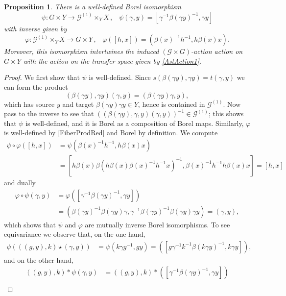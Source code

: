 \documentclass[11pt, oneside]{amsart}
\newtheorem{prop}[lemma]{Proposition}
\theoremstyle{definition}
\theoremstyle{remark}
\theoremstyle{TheoremNum}
\newcommand{\cG}{\mathcal{G}}
\renewcommand{\phi}{\varphi}
\begin{document}
\begin{prop}\label{psiIso} There is a well-defined Borel isomorphism
\begin{equation}\label{psi}
  \psi: G\times Y\to \mathcal{G}^{(1)} \times_Y X\,,\;\;\; \psi(\gamma,y)=[\gamma^{-1}\beta(\gamma y)^{-1}, \gamma y]\end{equation}
 with inverse given by
  $$\phi: \mathcal{G}^{(1)} \times_Y X \to G\times Y\,,\;\;\; \phi([h,x])=(\beta(x)^{-1} h^{-1} , h \beta(x) x).$$
 Moreover, this isomorphism intertwines the induced $(\cG \times G)$-action action on $G\times Y$ with the action on the transfer space given by \eqref{AstAction1}.
\end{prop}
\begin{proof} We first show that $\psi$ is well-defined. Since $s(\beta(\gamma y), \gamma y) = t(\gamma, y)$ we can form the product
\[
(\beta(\gamma y), \gamma y)(\gamma, y) = (\beta(\gamma y)\gamma, y),
\]
which has source $y$ and target $\beta(\gamma y)\gamma y \in Y$, hence is contained in $\cG^{(1)}$. Now pass to the inverse to see that $((\beta(\gamma y), \gamma, y)(\gamma, y))^{-1} \in \cG^{(1)}$; this shows that $\psi$ is well-defined, and it is Borel as a composition of Borel maps. Similarly, $\phi$ is well-defined by \eqref{FiberProdRed} and Borel by definition. We compute 
  \begin{align*}
    \psi \circ \phi([h,x]) &= \psi(\beta(x)^{-1} h^{-1},h \beta(x) x)\\
     & = [h \beta(x) \beta(h \beta(x)\beta(x)^{-1} h^{-1}x)^{-1} , \beta(x)^{-1} h^{-1}h\beta(x) x ] = [h,x]
  \end{align*}
  and dually
  \begin{align*}
  \phi\circ \psi(\gamma,y)&= \phi ([\gamma^{-1}\beta( \gamma y)^{-1},\gamma y])\\
 &= (\beta(\gamma y)^{-1}\beta( \gamma y) \gamma , \gamma^{-1}\beta(\gamma y)^{-1} \beta(\gamma y)\gamma y)=(\gamma,y),
  \end{align*}
  which shows that $\psi$ and $\phi$ are mutually inverse Borel isomorphisms. To see equivariance we observe that, on the one hand,
\begin{align*}
    \psi(((g,y),k)\star (\gamma,y))&=\psi(k\gamma g^{-1},gy) =([g\gamma^{-1}k^{-1} \beta(k\gamma y)^{-1},k\gamma y]),
\end{align*}
and on the other hand,
\begin{align*}
   ((g,y),k)  \ast \psi(\gamma,y)&=   ((g,y),k)\ast  ([\gamma^{-1}\beta(\gamma y)^{-1},\gamma y])\\

\end{align*}
\end{proof}
\end{document}
